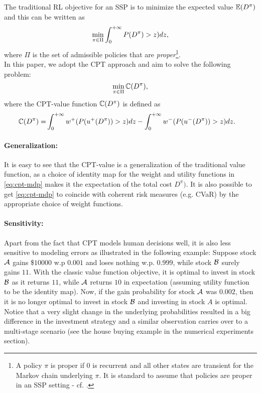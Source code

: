 \documentclass[11pt,letterpaper,english]{article}
\begin{document}
The traditional RL objective for an SSP is to minimize the expected value $\mathbb{E} (D^\pi)$ and this can be written as
$$\min_{\pi\in\Pi} \int_0^{+\infty} P(D^\pi)>z) dz,$$ where $\Pi$ is the set of admissible policies that are \textit{proper}\footnote{A policy $\pi$ is proper if $0$ is recurrent and all other states are transient for the Markov chain underlying $\pi$. It is standard to assume that policies are proper in an SSP setting - cf. \cite{bertsekas1995dynamic}.}.\\
In this paper, we adopt the CPT approach and aim to solve the following problem: 
$$ \min_{\pi \in \Pi} \mathbb{C}(D^\pi),$$
where the CPT-value function $\mathbb{C}(D^\pi)$ is defined as
\begin{align}
\mathbb{C}(D^\pi) = &\int_0^{+\infty} w^+(P(u^+(D^\pi))>z) dz - \int_0^{+\infty} w^-(P(u^-(D^\pi))>z) dz. \label{eq:cpt-mdp}
\end{align}

\paragraph{Generalization:} It is easy to see that the CPT-value is a generalization of the traditional value function, as a choice of identity map for the weight and utility functions in \eqref{eq:cpt-mdp} makes it the expectation of the total cost $D^\pi)$.  It is also possible to get \eqref{eq:cpt-mdp} to coincide with coherent risk measures (e.g. CVaR) by the appropriate choice of weight functions.

\paragraph{Sensitivity:}
Apart from the fact that CPT models human decisions well, it is also less sensitive to modeling errors as illustrated in the following example: 
Suppose stock $\cal{A}$ gains \$$10000$ w.p $0.001$ and loses nothing w.p. $0.999$, while stock $\cal B$ surely gains $11$. With the classic value function objective, it is optimal to invest in stock $\cal B$ as it returns $11$,  while $\cal A$ returns $10$ in expectation (assuming utility function to be the identity map). Now, if the gain probability for stock $\cal A$ was $0.002$, then it is no longer optimal to invest in stock $\cal B$ and investing in stock $A$ is optimal.
Notice that a very slight change in the underlying probabilities resulted in a big difference in the investment strategy and a similar observation carries over to a multi-stage scenario (see the house buying example in the numerical experiments section). 
\end{document}
